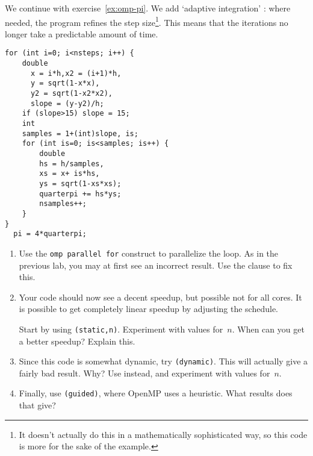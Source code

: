 \begin{exercise}
  \label{ex:omp-pi-adapt}
  We continue with exercise~\ref{ex:omp-pi}.
  We add `adaptive integration'%
  :
  where needed, the program refines the step
  size\footnote{It doesn't actually do this in a mathematically
    sophisticated way, so this code is more for the sake of the
    example.}.  This means that the iterations no longer take a
  predictable amount of time.

\begin{multicols}{2}
\begin{lstlisting}
for (int i=0; i<nsteps; i++) {
    double
      x = i*h,x2 = (i+1)*h,
      y = sqrt(1-x*x),
      y2 = sqrt(1-x2*x2),
      slope = (y-y2)/h;
    if (slope>15) slope = 15;
    int
    samples = 1+(int)slope, is;
    for (int is=0; is<samples; is++) {
        double
        hs = h/samples,
        xs = x+ is*hs,
        ys = sqrt(1-xs*xs);
        quarterpi += hs*ys;
        nsamples++;
    }
}
  pi = 4*quarterpi;
\end{lstlisting}
\end{multicols}

\begin{enumerate}
\item Use the \lstinline{omp parallel for} construct to parallelize the loop.
  As in the previous lab, you may at first see an incorrect result.
  Use the  clause to fix this.
\item Your code should now see a decent speedup, but possible not for all cores.
  It is possible to get completely linear speedup by adjusting the schedule.

  Start by using \lstinline{(static,n)}.
  Experiment with values for~$n$.
  When can you get a better speedup? Explain this.
\item Since this code is somewhat dynamic, try \lstinline{(dynamic)}.
  This will actually give a fairly bad result. Why?  Use
   instead, and experiment with values
  for~$n$.
\item Finally, use \lstinline{(guided)}, where OpenMP uses a
  heuristic.  What results does that give?
\end{enumerate}
     
\end{exercise}

